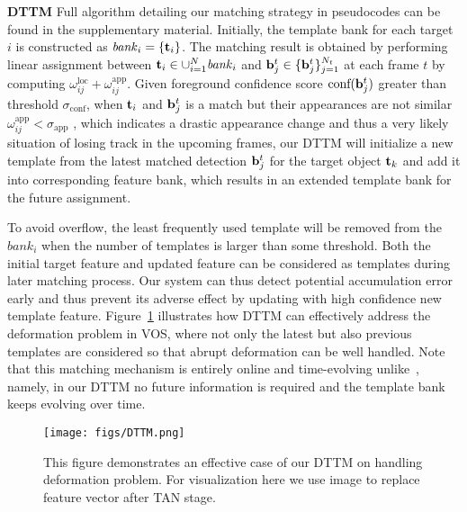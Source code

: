 \documentclass[10pt,twocolumn,letterpaper]{article}
\begin{document}
\vspace{1mm}
{\bf DTTM}
 Full algorithm detailing our matching strategy in pseudocodes can be found in the supplementary material.
Initially, the template bank for each target $i$ is constructed as $\mathit{bank}_i = \{{\bf{t}}_i\}$.
The matching result is obtained by performing linear assignment between ${\bf{t}}_i \in \cup_{i=1}^{N}  \mathit{bank}_i$ and ${\bf{b}}^t_{j} \in \{{\bf{b}}^t_{j}\}_{j=1}^{N_t}$ at each frame $t$ by computing $\omega^{\text{loc}}_{ij} + \omega^{\text{app}}_{ij}$.
Given foreground confidence score $\text{conf}({\bf{b}}^t_j)$ greater than threshold $\sigma_{\text{conf}}$, when ${\bf{t}}_i$ and ${\bf{b}}^t_j$ is a match but their appearances are not similar $\omega^{\text{app}}_{ij} < \sigma_{\text{app}}$ , which indicates a drastic appearance change and thus a very likely situation of losing track in the upcoming frames,
our DTTM will initialize a new template from the latest matched detection ${\bf{b}}_j^t$ for the target object ${\bf{t}}_k$ and add it into corresponding feature bank, which results in an extended template bank for the future assignment.

To avoid overflow, the least frequently used template will be removed from the $\mathit{\mathit{bank}}_i$ when the number of templates is larger than some threshold.  Both the initial target feature and updated feature can be considered as templates during later matching process.
Our system can thus detect potential accumulation error early and thus prevent its adverse effect by updating with high confidence new template feature.
 Figure~\ref{fig:DTTM} illustrates how DTTM can effectively address the deformation problem in VOS,
 where not only the latest but also previous templates are considered so that abrupt deformation can be well handled.
 Note that this matching mechanism is entirely online and time-evolving unlike~\cite{luiten2018premvos}, namely, in our DTTM no future information is required and the template bank keeps evolving over time.




\begin{figure}[]
\begin{center}
   \texttt{[image: figs/DTTM.png]}
\end{center}
\caption{This figure demonstrates an effective case of our DTTM on handling deformation problem. For visualization here we use image to replace feature vector after TAN stage.}
    \vspace*{-15pt}
\label{fig:DTTM}
\end{figure}
\end{document}
